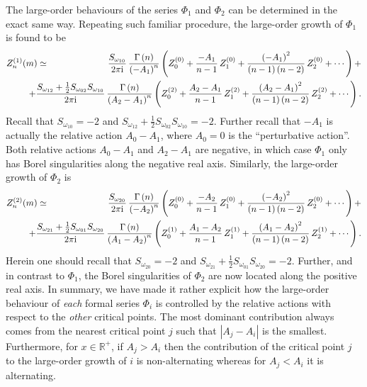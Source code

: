 \documentclass[11pt,a4paper]{article}
\begin{document}
The large-order behaviours of the series $\Phi_1$ and $\Phi_2$ can be determined in the exact same way. Repeating such familiar procedure, the large-order growth of $\Phi_1$ is found to be
%
\begin{eqnarray}
\label{large_order_aB}
Z^{(1)}_n (m) &\simeq& \frac{S_{\omega_{10}}}{2\pi\mathrm{i}}\, \frac{\Gamma\left(n\right)}{\left(-A_1\right)^n} \left( Z^{(0)}_0 + \frac{-A_1}{n-1}\, Z^{(0)}_1 + \frac{\left(-A_1\right)^2}{\left(n-1\right) \left(n-2\right)}\, Z^{(0)}_2 + \cdots \right) + \\
&&
\hspace{-30pt}
+ \frac{S_{\omega_{12}}+\frac{1}{2}S_{\omega_{02}}S_{\omega_{10}}}{2\pi \mathrm{i}}\, \frac{\Gamma\left(n\right)}{\left(A_2-A_1\right)^n} \left( Z^{(2)}_0 + \frac{A_2-A_1}{n-1}\, Z^{(2)}_1 + \frac{\left(A_2-A_1\right)^2}{\left(n-1\right) \left(n-2\right)}\, Z^{(2)}_2 + \cdots \right).
\nonumber 
\end{eqnarray}
%
\noindent
Recall that $S_{\omega_{10}}=-2$ and $S_{\omega_{12}}+\frac{1}{2}S_{\omega_{02}}S_{\omega_{10}}=-2$. Further recall that $-A_1$ is actually the relative action $A_0-A_1$, where $A_0=0$ is the ``perturbative action''. Both relative actions $A_0-A_1$ and $A_2-A_1$ are negative, in which case $\Phi_1$ only has Borel singularities along the negative real axis. Similarly, the large-order growth of $\Phi_2$ is
%
\begin{eqnarray}
Z^{(2)}_n (m) &\simeq& \frac{S_{\omega_{20}}}{2\pi\mathrm{i}}\, \frac{\Gamma\left(n\right)}{\left(-A_2\right)^n} \left( Z^{(0)}_0 + \frac{-A_2}{n-1}\, Z^{(0)}_1 + \frac{\left(-A_2\right)^2}{\left(n-1\right) \left(n-2\right)}\, Z^{(0)}_2 + \cdots \right) + \\
&&
\hspace{-30pt}
+ \frac{S_{\omega_{21}}+\frac{1}{2}S_{\omega_{01}}S_{\omega_{20}}}{2\pi \mathrm{i}}\, \frac{\Gamma\left(n\right)}{\left(A_1-A_2\right)^n} \left( Z^{(1)}_0 + \frac{A_1-A_2}{n-1}\, Z^{(1)}_1 + \frac{\left(A_1-A_2\right)^2}{\left(n-1\right) \left(n-2\right)}\, Z^{(1)}_2 + \cdots \right).
\nonumber
\end{eqnarray}
%
\noindent
Herein one should recall that $S_{\omega_{20}}=-2$ and $S_{\omega_{21}}+\frac{1}{2}S_{\omega_{01}}S_{\omega_{20}}=-2$. Further, and in contrast to $\Phi_1$, the Borel singularities of $\Phi_2$ are now located along the positive real axis. In summary, we have made it rather explicit how the large-order behaviour of \textit{each} formal series $\Phi_i$ is controlled by the relative actions with respect to the \textit{other} critical points. The most dominant contribution always comes from the nearest critical point $j$ such that $|A_j-A_i|$ is the smallest. Furthermore, for $x\in\mathbb R^+$, if $A_j>A_i$ then the contribution of the critical point $j$ to the large-order growth of $i$ is non-alternating whereas for $A_j<A_i$ it is alternating.  
\end{document}
